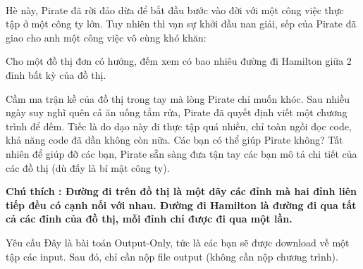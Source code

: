  

Hè này, Pirate đã rời đảo dừa để bắt đầu bước vào đời với một công việc thực tập ở một công ty lớn. Tuy nhiên thì vạn sự khởi đầu nan giải, sếp của Pirate đã giao cho anh một công việc vô cùng khó khăn:

Cho một đồ thị đơn có hướng, đếm xem có bao nhiêu đường đi Hamilton giữa 2 đỉnh bất kỳ của đồ thị.

Cầm ma trận kề của đồ thị trong tay mà lòng Pirate chỉ muốn khóc. Sau nhiều ngày suy nghĩ quên cả ăn uống tắm rửa, Pirate đã quyết định viết một chương trình để đếm. Tiếc là do dạo này đi thực tập quá nhiều, chỉ toàn ngồi đọc code, khả năng code đã dần không còn nữa. Các bạn có thể giúp Pirate không? Tất nhiên để giúp đỡ các bạn, Pirate sẵn sàng đưa tận tay các bạn mô tả chi tiết của các đồ thị (dù đấy là bí mật công ty).

\textbf{Chú thích : Đường đi trên đồ thị là một dãy các đỉnh mà hai đỉnh liên tiếp đều có cạnh nối với nhau. Đường đi Hamilton là đường đi qua tất cả các đỉnh của đồ thị, mỗi đỉnh chỉ được đi qua một lần. }

Yêu cầu
Đây là bài toán Output-Only, tức là các bạn sẽ được download về một tập các input. Sau đó, chỉ cần nộp file output (không cần nộp chương trình).